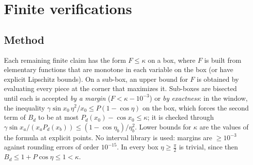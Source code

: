 \documentclass[11pt]{amsart}
\theoremstyle{definition}\newtheorem{definition}[theorem]{Definition}\theoremstyle{remark}\newtheorem{remark}[theorem]{Remark}
\begin{document}
\appendix
\section{Finite verifications}\label{app:fin}
\subsection{Method}
Each remaining finite claim has the form $F\le\kappa$ on a box, where $F$ is built from elementary functions that are monotone in each variable on the box (or have
explicit Lipschitz bounds). On a sub-box, an upper bound for $F$ is obtained by evaluating every piece at the corner that maximizes it. Sub-boxes are bisected until
each is accepted \emph{by a margin} ($F<\kappa-10^{-3}$) or \emph{by exactness}: in the window, the inequality $\gamma\sin x_0\,\eta^2/x_0\le P(1-\cos\eta)$ on the box, which forces the
second term of $B_d$ to be at most $P_d(x_0)-\cos x_0\le\kappa$; it is checked through $\gamma\sin x_a/(x_aP_d(x_b))\le(1-\cos\eta_b)/\eta_b^2$. Lower bounds for $\kappa$ are the
values of the formula at explicit points. No interval library is used: margins are $\ge10^{-3}$ against rounding errors of order $10^{-15}$. In every box
$\eta\ge\frac\pi2$ is trivial, since then $B_d\le1+P\cos\eta\le1<\kappa$.
\end{document}
